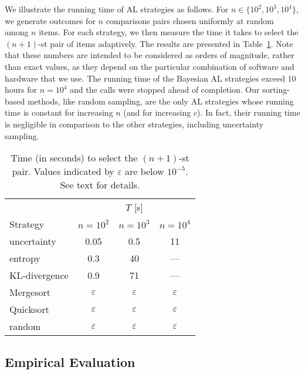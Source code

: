 We illustrate the running time of AL strategies as follows.
For $n \in \{10^2, 10^3, 10^4 \}$, we generate outcomes for $n$ comparisons pairs chosen uniformly at random among $n$ items.
For each strategy, we then measure the time it takes to select the $(n\!+\!1)$-st pair of items adaptively.
The results are presented in Table~\ref{tab:runningtime}.
Note that these numbers are intended to be considered as orders of magnitude, rather than exact values, as they depend on the particular combination of software and hardware that we use.
The running time of the Bayesian AL strategies exceed \num{10} hours for $n = 10^4$ and the calls were stopped ahead of completion.
Our sorting-based methods, like random sampling, are the only AL strategies whose running time is constant for increasing $n$ (and for increasing $c$).
In fact, their running time is negligible in comparison to the other strategies, including uncertainty sampling.

\begin{table}[t]
  \caption{
Time (in seconds) to select the $(n\!+\!1)$-st pair.
Values indicated by $\varepsilon$ are below $10^{-5}$.
See text for details.
}
  \vspace{2mm}
  \label{tab:runningtime}
  \centering
  \begin{tabular}{l ccc}
    \toprule
                  & \multicolumn{3}{c}{$T$ [s]} \\
                    \cmidrule(l){2-4}
    Strategy      & $n = 10^2$ & $n = 10^3$ & $n = 10^4$ \\
    \midrule
    uncertainty   & \num{0.05}      & \num{0.5}        & \num{11}      \\
    entropy       & \num{0.3}       & \num{40}         & ---           \\
    KL-divergence & \num{0.9}       & \num{71}         & ---           \\
    Mergesort     & $\varepsilon$   & $\varepsilon$    & $\varepsilon$ \\
    Quicksort     & $\varepsilon$   & $\varepsilon$    & $\varepsilon$ \\
    random        & $\varepsilon$   & $\varepsilon$    & $\varepsilon$ \\
    \bottomrule
  \end{tabular}
\end{table}


\subsection{Empirical Evaluation}

